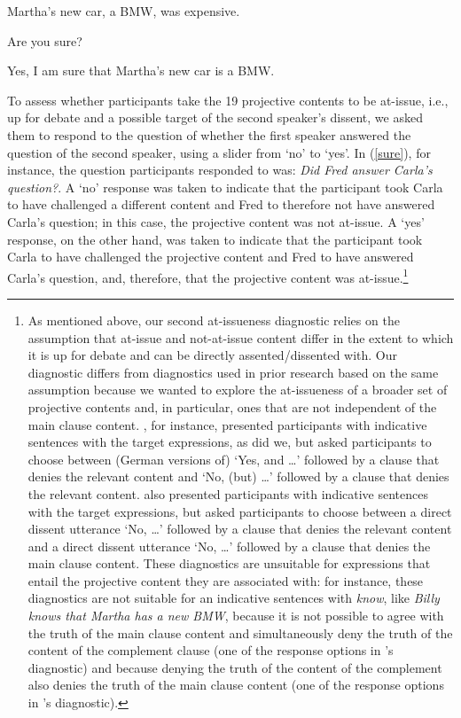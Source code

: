 \documentclass[11pt,fleqn]{article}
\newcommand{\6}{\mbox{$[\hspace*{-.6mm}[$}}
\newcommand{\9}{\mbox{$]\hspace*{-.6mm}]$}}
\newcommand{\citepos}[1]{\citeauthor{#1}'s \citeyear{#1}}
\begin{document}
\begin{exe}
\ex\label{sure} 
\begin{xlist}
 Martha's new car, a BMW, was expensive.

 Are you sure?

 Yes, I am sure that Martha's new car is a BMW.
\end{xlist}
\end{exe}
To assess whether participants take the 19 projective contents to be at-issue, i.e., up for debate and a possible target of the second speaker's dissent, we asked them to respond to the question of whether the first speaker answered the question of the second speaker, using a slider from `no' to `yes'. In (\ref{sure}), for instance, the question participants responded to was: {\em Did Fred answer Carla's question?}. A `no' response was taken to indicate that the participant took Carla to have challenged a different content and Fred to therefore not have answered Carla's question; in this case, the projective content was not at-issue. A `yes' response, on the other hand, was taken to indicate that the participant took Carla to have challenged the projective content and Fred to have answered Carla's question, and, therefore, that the projective content was at-issue.\footnote{As mentioned above, our second at-issueness diagnostic relies on the assumption that at-issue and not-at-issue content differ in the extent to which it is up for debate and can be directly assented/dissented with. Our diagnostic differs from diagnostics used in prior research based on the same assumption because we wanted to explore the at-issueness of a broader set of projective contents and, in particular, ones that are not independent of the main clause content.  \citet{xue-onea11}, for instance, presented participants with indicative sentences with the target expressions, as did we, but asked participants to choose between (German versions of) `Yes, and \ldots' followed by a clause that denies the relevant content and `No, (but) \ldots' followed by a clause that denies the relevant content.  \citet{syrett-koev2015} also presented participants with indicative sentences with the target expressions, but asked participants to choose between a direct dissent utterance `No, \ldots' followed by a clause that denies the relevant content and a direct dissent utterance `No, \ldots' followed by a clause that denies the main clause content. These diagnostics are unsuitable for expressions that entail the projective content they are associated with: for instance, these diagnostics are not suitable for an indicative sentences with {\em know}, like {\em Billy knows that Martha has a new BMW}, because it is not possible to agree with the truth of the main clause content and simultaneously deny the truth of the content of the complement clause (one of the response options in \citepos{xue-onea11} diagnostic) and because denying the truth of the content of the complement also denies the truth of the main clause content (one of the response options in \citepos{syrett-koev2015} diagnostic).}
\end{document}
